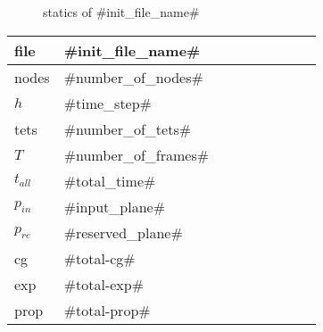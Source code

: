 
\begin{figure}
  \centering
  \caption{statics of #init_file_name#}
  \label{en_f}
\end{figure}

\begin{center}
  \begin{tabular}{|l*{8}{|l}}
    \hline
	file & #init_file_name# \\ \hline
	nodes & #number_of_nodes# \\ \hline
	$h$ & #time_step# \\ \hline
	tets & #number_of_tets# \\ \hline
	$T$ & #number_of_frames# \\ \hline
	$t_{all}$ & #total_time# \\ \hline
    $p_{in}$ & #input_plane# \\ \hline
	$p_{re}$ & #reserved_plane# \\ \hline
	cg & #total-cg# \\ \hline
	exp & #total-exp# \\ \hline
	prop & #total-prop# \\ \hline
  \end{tabular}
\end{center}
